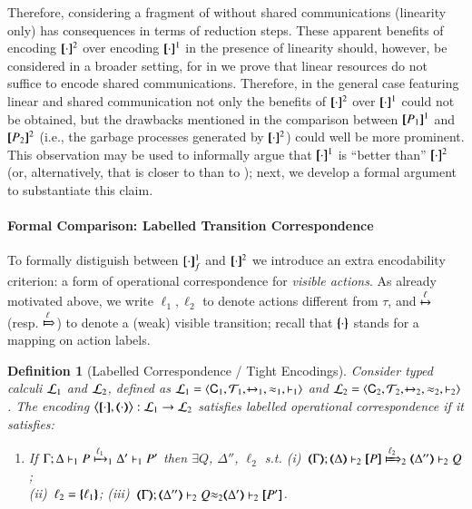 \documentclass[preprint,11pt]{elsarticle}
\newtheorem{definition}{Definition}[section]
\begin{document}
{{Therefore, considering a fragment of \HOp without shared communications (linearity only)
has consequences in terms of reduction steps. 
These apparent benefits of encoding  $\pmap{\cdot}{2}$ over 
encoding  $\pmap{\cdot}{1}$ in the presence of linearity should, however, be considered in a broader setting, for 
in  we prove that linear resources do 
not suffice to encode shared communications.
Therefore, in the general case featuring linear and shared communication not only the benefits of  $\pmap{\cdot}{2}$ over  $\pmap{\cdot}{1}$ could not be obtained,
but the drawbacks mentioned in the comparison between $\pmap{P_1}{1}$ and $\pmap{P_2}{2}$ (i.e., the garbage processes 
generated by $\pmap{\cdot}{2}$) 
could well be more prominent. This observation may be used to informally argue that $\pmap{\cdot}{1}$ is ``better than'' $\pmap{\cdot}{2}$ (or, alternatively, that \HOp is closer to \HO than to \sessp);
next, we develop a formal argument to substantiate this claim.

\paragraph{Formal Comparison: Labelled Transition Correspondence}
To formally  distiguish between $\map{\cdot}_f^1$ and $\pmap{\cdot}{2}$
we introduce an extra encodability criterion: a form of operational correspondence 
for \emph{visible actions}. 
As already motivated above, 
we write $\ell_1, \ell_2$ to denote  
actions different from $\tau$,
and  $\hby{\ell}$ (resp. $\Hby{\ell}$) to denote a (weak) visible transition;
recall that $\mapa{\cdot}$ stands for a mapping 
on action labels.

\begin{definition}[Labelled Correspondence / Tight Encodings]%
\label{def:lopco}
       Consider typed calculi $\tyl{L}_1$ and  $\tyl{L}_2$, defined as 
        $\tyl{L}_1=\calc{\CAL_1}{{\cal{T}}_1}{\hby{{~}}_1}{\wb_1}{\proves_1}$
       and $\tyl{L}_2=\calc{\CAL_2}{{\cal{T}}_2}{\hby{{~}}_2}{\wb_2}{\proves_2}$.
The encoding $\enco{\map{\cdot}, \mapt{\cdot}}: \tyl{L}_1 \to \tyl{L}_2$ satisfies
\emph{labelled operational correspondence}
if it satisfies:
	\begin{enumerate}[1.]
			\item
					If		$\stytraargi{\Gamma}{\ell_1}{\Delta}{P}{\Delta'}{P'}{1}{1}$
					then	$\exists Q$, $\Delta''$, $\ell_2$ s.t. 
							(i)~$\wtytraargi{\mapt{\Gamma}}{\ell_2}{\mapt{\Delta}}{\map{P}}{\mapt{\Delta''}}{Q}{2}{2}$;  \\
							(ii)~$\ell_2 = \mapa{\ell_1}$; 
							(iii)~${\mapt{\Gamma}};{\mapt{\Delta''}}\proves_2 {Q}{\wb_2}{\mapt{\Delta'}}\proves_2 {\map{P'}}$.
				

\end{enumerate}
\end{definition}}}
\end{document}
